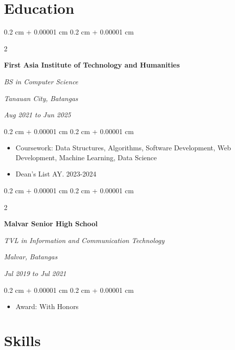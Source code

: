 \documentclass[10pt, letterpaper]{article}
\newenvironment{highlights}{
    \begin{itemize}[
        topsep=0.10 cm,
        parsep=0.10 cm,
        partopsep=0pt,
        itemsep=0pt,
        leftmargin=0.4 cm + 10pt
    ]
}{
    \end{itemize}
} %
\newenvironment{onecolentry}{
    \begin{adjustwidth}{
        0.2 cm + 0.00001 cm
    }{
        0.2 cm + 0.00001 cm
    }
}{
    \end{adjustwidth}
} %
\newenvironment{twocolentry}[2][]{
    \onecolentry
    \def\secondColumn{#2}
    \setcolumnwidth{\fill, 4.5 cm}
    \begin{paracol}{2}
}{
    \switchcolumn \raggedleft \secondColumn
    \end{paracol}
    \endonecolentry
} %
\begin{document}
    
    \section{Education}



        
        \begin{twocolentry}{
        \textit{Tanauan City, Batangas}    
            
        \textit{Aug 2021 to Jun 2025}}
            \textbf{First Asia Institute of Technology and Humanities}

            \textit{BS in Computer Science}
        \end{twocolentry}

        \vspace{0.10 cm}
        \begin{onecolentry}
            \begin{highlights}
                \item Coursework: Data Structures, Algorithms, Software Development, Web Development, Machine Learning, Data Science
                \item Dean's List AY. 2023-2024
            \end{highlights}
        \end{onecolentry}


        \vspace{0.2 cm}

        \begin{twocolentry}{
        \textit{Malvar, Batangas}    
            
        \textit{Jul 2019 to Jul 2021}}
            \textbf{Malvar Senior High School}

            \textit{TVL in Information and Communication Technology}
        \end{twocolentry}

        \vspace{0.10 cm}
        \begin{onecolentry}
            \begin{highlights}
                \item Award: With Honors
            \end{highlights}
        \end{onecolentry}



    
    \section{Skills}
\end{document}
